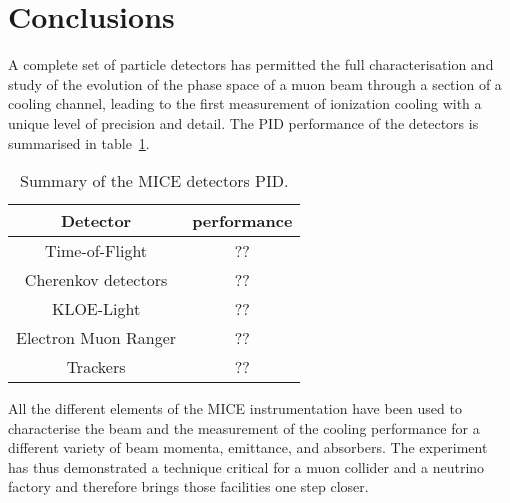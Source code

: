 \graphicspath{{80-Conclusions/Figures/}}

\section{Conclusions}
\label{Sect:Conclusions}

A complete set of particle detectors has permitted the full characterisation and study of the evolution of the phase space of a muon beam through a section of a cooling channel, leading to the first measurement of ionization cooling with a unique level of precision and detail.
The PID performance of the detectors is summarised in table~\ref{tab:pid}.


\begin{table}[htb!]
	\centering
	\begin{tabular}{c|c}
	  Detector              & performance \\
		\hline
    Time-of-Flight        & ?? \\
    Cherenkov detectors   & ?? \\
    KLOE-Light            & ?? \\
    Electron Muon Ranger  & ?? \\
    Trackers              & ?? \\
  \end{tabular}
	\caption{Summary of the MICE detectors PID.}
	\label{tab:pid}
\end{table}

All the different elements of the MICE instrumentation have been used to characterise the beam and the measurement of the cooling performance for a different variety of beam momenta, emittance, and absorbers.
The experiment has thus demonstrated a technique critical for a muon collider and a neutrino factory and therefore brings those facilities one step closer.
